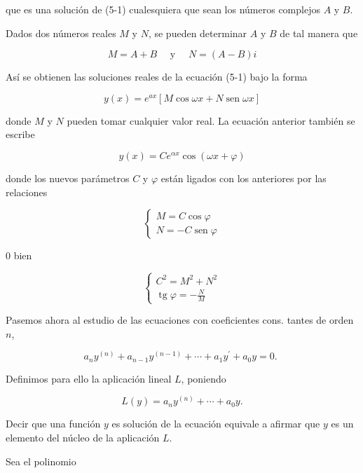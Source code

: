 \documentclass[10pt]{article}
\theoremstyle{plain}
\theoremstyle{definition}
\theoremstyle{remark}
\begin{document}
que es una solución de (5-1) cualesquiera que sean los números complejos $A$ y $B$.

Dados dos números reales $M$ y $N$, se pueden determinar $A$ y $B$ de tal manera que

$$
M=A+B \quad \text { y } \quad N=(A-B) i
$$

Así se obtienen las soluciones reales de la ecuación (5-1) bajo la forma


\begin{equation*}
y(x)=e^{a x}[M \cos \omega x+N \operatorname{sen} \omega x] \tag{5-3}
\end{equation*}


donde $M$ y $N$ pueden tomar cualquier valor real. La ecuación anterior también se escribe


\begin{equation*}
y(x)=C e^{\alpha x} \cos (\omega x+\varphi) \tag{5-4}
\end{equation*}


donde los nuevos parámetros $C$ y $\varphi$ están ligados con los anteriores por las relaciones

$$
\left\{\begin{array}{l}
M=C \cos \varphi \\
N=-C \operatorname{sen} \varphi
\end{array}\right.
$$

0 bien

$$
\left\{\begin{array}{l}
C^{2}=M^{2}+N^{2} \\
\operatorname{tg} \varphi=-\frac{N}{M}
\end{array}\right.
$$


Pasemos ahora al estudio de las ecuaciones con coeficientes cons. tantes de orden $n$,


\begin{equation*}
a_{n} y^{(n)}+a_{n-1} y^{(n-1)}+\cdots+a_{1} y^{\prime}+a_{0} y=0 \text {. } \tag{5-5}
\end{equation*}


Definimos para ello la aplicación lineal $L$, poniendo


\begin{equation*}
L(y)=a_{n} y^{(n)}+\cdots+a_{0} y . \tag{5-6}
\end{equation*}


Decir que una función $y$ es solución de la ecuación equivale a afirmar que $y$ es un elemento del núcleo de la aplicación $L$.

Sea el polinomio
\end{document}
